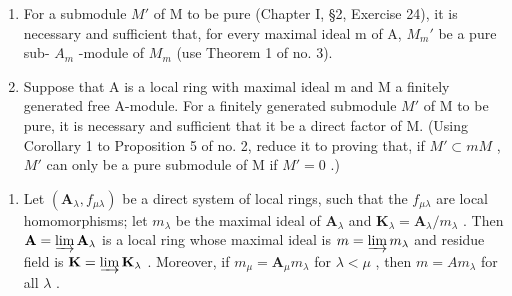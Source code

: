 \begin{enumerate}
\def\labelenumi{(\alph{enumi})}
\item
  For a submodule \(M'\) of M to be pure (Chapter I, §2, Exercise 24), it is necessary and sufficient that, for every maximal ideal m of A, \(M_{m}'\) be a pure sub- \(A_{m}\) -module of \(M_{m}\) (use Theorem 1 of no. 3).
\item
  Suppose that A is a local ring with maximal ideal m and M a finitely generated free A-module. For a finitely generated submodule \(M'\) of M to be pure, it is necessary and sufficient that it be a direct factor of M. (Using Corollary 1 to Proposition 5 of no. 2, reduce it to proving that, if \(M' \subset mM\) , \(M'\) can only be a pure submodule of M if \(M' = 0\) .)
\end{enumerate}

\begin{enumerate}
\def\labelenumi{\arabic{enumi}.}
\setcounter{enumi}{15}
\tightlist
\item
  Let \((\mathbf{A}_{\lambda}, f_{\mu \lambda})\) be a direct system of local rings, such that the \(f_{\mu \lambda}\) are local homomorphisms; let \(m_{\lambda}\) be the maximal ideal of \(\mathbf{A}_{\lambda}\) and \(\mathbf{K}_{\lambda} = \mathbf{A}_{\lambda} / m_{\lambda}\) . Then \(\mathbf{A} = \varinjlim \mathbf{A}_{\lambda}\) is a local ring whose maximal ideal is \(m = \varinjlim m_{\lambda}\) and residue field is \(\mathbf{K} = \varinjlim \mathbf{K}_{\lambda}\) . Moreover, if \(m_{\mu} = \mathbf{A}_{\mu} m_{\lambda}\) for \(\lambda < \mu\) , then \(m = Am_{\lambda}\) for all \(\lambda\) .
\end{enumerate}


